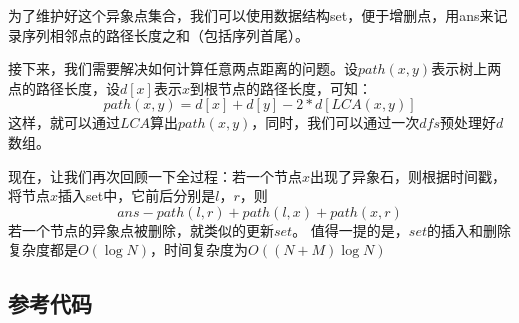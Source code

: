 \documentclass[UTF8]{ctexart}
\begin{document}
	为了维护好这个异象点集合，我们可以使用数据结构set，便于增删点，用ans来记录序列相邻点的路径长度之和（包括序列首尾）。
	
	接下来，我们需要解决如何计算任意两点距离的问题。设$path(x,y)$表示树上两点的路径长度，设$d[x]$表示$x$到根节点的路径长度，可知：
	\begin{equation}
		path(x,y)=d[x]+d[y]-2*d[LCA(x,y)]
	\end{equation}
	这样，就可以通过$LCA$算出$path(x,y)$，同时，我们可以通过一次$dfs$预处理好$d$数组。
	
	现在，让我们再次回顾一下全过程：若一个节点$x$出现了异象石，则根据时间戳，将节点$x$插入set中，它前后分别是$l$，$r$，则
	$$ans-path(l,r)+path(l,x)+path(x,r)$$
	若一个节点的异象点被删除，就类似的更新$set$。
	值得一提的是，$set$的插入和删除复杂度都是$O(\log N)$，时间复杂度为$O((N+M)\log N)$
	\subsection{参考代码}
	
	
\end{document}
